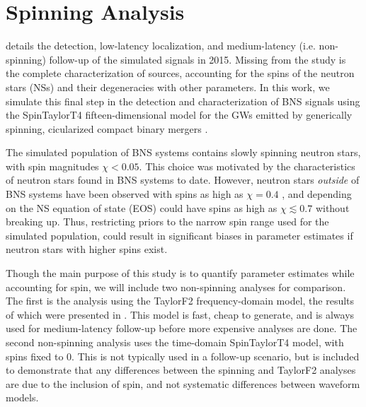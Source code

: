 \section{Spinning Analysis}
\label{sec:spin}

\citet{Singer_2014} details the detection, low-latency localization, and medium-latency (i.e. non-spinning) follow-up of the simulated signals in 2015.  Missing from the study is the complete characterization of sources, accounting for the spins of the neutron stars (NSs) and their degeneracies with other parameters.  In this work, we simulate this final step in the detection and characterization of BNS signals using the SpinTaylorT4 fifteen-dimensional model for the GWs emitted by generically spinning, cicularized compact binary mergers \citep{Buonanno_2003,Buonanno_2009}.

The simulated population of BNS systems contains slowly spinning neutron stars, with spin magnitudes $\chi < 0.05$.  This choice was motivated by the characteristics of neutron stars found in BNS systems to date. However, neutron stars \emph{outside} of BNS systems have been observed with spins as high as $\chi = 0.4$ \citep{Hessels_2006,Brown_2012}, and depending on the NS equation of state (EOS) could have spins as high as $\chi \lesssim 0.7$ \citep{Lo_2011} without breaking up.  Thus, restricting priors to the narrow spin range used for the simulated population, could result in significant biases in parameter estimates if neutron stars with higher spins exist.

Though the main purpose of this study is to quantify parameter estimates while accounting for spin, we will include two non-spinning analyses for comparison.  The first is the analysis using the TaylorF2 frequency-domain model, the results of which were presented in \citet{Singer_2014}.  This model is fast, cheap to generate, and is always used for medium-latency follow-up before more expensive analyses are done.  The second non-spinning analysis uses the time-domain SpinTaylorT4 model, with spins fixed to $0$.  This is not typically used in a follow-up scenario, but is included to demonstrate that any differences between the spinning and TaylorF2 analyses are due to the inclusion of spin, and not systematic differences between waveform models.

